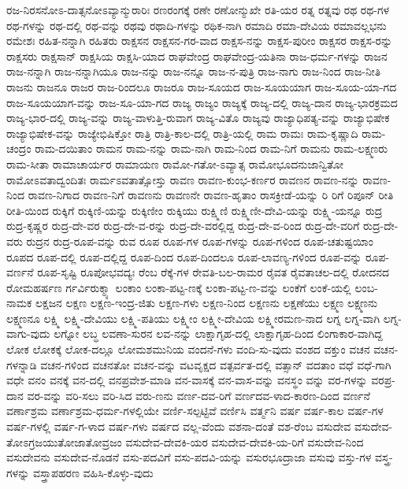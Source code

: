ರಜ-ನಿರಸನೋಽ-ದಾತ್ಸನೋಽವ್ಯಾನ್ಮುರಾರಿಃ
ರಣರಂಗಕ್ಕೆ
ರಣೇ
ರಣೋನ್ಮುಖೇ
ರತಿ-ಯರ
ರತ್ನ
ರತ್ನವು
ರಥ
ರಥ-ಗಳ
ರಥ-ಗಳನ್ನು
ರಥ-ದಲ್ಲಿ
ರಥ-ವನ್ನು
ರಥವು
ರಥಾದಿ-ಗಳನ್ನು
ರಥಿಕ-ನಾಗಿ
ರಮಾದಿ
ರಮಾ-ದೇವಿಯ
ರಮಾವಲ್ಲಭನು
ರಮೇಶಃ
ರಹಿತ-ನನ್ನಾಗಿ
ರಹಿತರು
ರಾಕ್ಷಸನ
ರಾಕ್ಷಸನ-ಗರ-ವಾದ
ರಾಕ್ಷಸ-ನನ್ನು
ರಾಕ್ಷಸ-ಪುರೀಂ
ರಾಕ್ಷಸರ
ರಾಕ್ಷಸ-ರನ್ನು
ರಾಕ್ಷಸರು
ರಾಕ್ಷಸಾನ್
ರಾಕ್ಷಸಿಯ
ರಾಕ್ಷಸಿ-ಯಾದ
ರಾಘವೇಂದ್ರ
ರಾಘವೇಂದ್ರ-ಯತಿನಾ
ರಾಜ-ಧರ್ಮ-ಗಳನ್ನು
ರಾಜನ
ರಾಜ-ನನ್ನಾಗಿ
ರಾಜ-ನನ್ನಾಗಿಯೂ
ರಾಜ-ನನ್ನು
ರಾಜ-ನನ್ನೂ
ರಾಜ-ನ-ಪುತ್ರಿ
ರಾಜ-ನಾಗು
ರಾಜ-ನಿಂದ
ರಾಜ-ನೀತಿ
ರಾಜನು
ರಾಜನೂ
ರಾಜರ
ರಾಜ-ರಿಂದಲೂ
ರಾಜರೂ
ರಾಜ-ಸೂಯದ
ರಾಜ-ಸೂಯಯಾಗ
ರಾಜ-ಸೂಯ-ಯಾ-ಗದ
ರಾಜ-ಸೂಯಯಾಗ-ವನ್ನು
ರಾಜ-ಸೂ-ಯಾ-ಗದ
ರಾಜ್ಯ
ರಾಜ್ಯಂ
ರಾಜ್ಯಕ್ಕೆ
ರಾಜ್ಯ-ದಲ್ಲಿ
ರಾಜ್ಯ-ದಾನ
ರಾಜ್ಯ-ಭಾರಕ್ರಮದ
ರಾಜ್ಯ-ಭಾರ-ದಲ್ಲಿ
ರಾಜ್ಯ-ವನ್ನು
ರಾಜ್ಯ-ವಾಳುತ್ತಿ-ರುವಾಗ
ರಾಜ್ಯ-ವಿತೊ
ರಾಜ್ಯವು
ರಾಜ್ಯಾಧಿಪತ್ಯ-ವನ್ನು
ರಾಜ್ಯಾಭಿಷೇಕ
ರಾಜ್ಯಾಭಿಷೇಕ-ವನ್ನು
ರಾಜ್ಯೇಭಿಷಿಕ್ತೋ
ರಾತ್ರಿ
ರಾತ್ರಿ-ಕಾಲ-ದಲ್ಲಿ
ರಾತ್ರಿ-ಯಲ್ಲಿ
ರಾಮ
ರಾಮಃ
ರಾಮ-ಕೃಷ್ಣಾದಿ
ರಾಮ-ಚಂದ್ರಂ
ರಾಮ-ದಯಿತಾಂ
ರಾಮನ
ರಾಮ-ನನ್ನು
ರಾಮ-ನಾಗಿ
ರಾಮ-ನಿಂದ
ರಾಮ-ನಿಗೆ
ರಾಮನು
ರಾಮ-ಲಕ್ಷ್ಮಣರು
ರಾಮ-ಸೀತಾ
ರಾಮಾಚಾರ್ಯರ
ರಾಮಾಯಣ
ರಾಮೋ-ಗತೋ-ಽವ್ಯಾತ್ಸ
ರಾಮೋಭೂದನುಜಾನ್ವಿತೋ
ರಾಮೋಽವತಾದ್ವಂದಿತಃ
ರಾರ್ಮಽವತಾತ್ಸೋಸ್ತು
ರಾವಣ
ರಾವಣ-ಕುಂಭ-ಕರ್ಣರ
ರಾವಣನ
ರಾವಣ-ನನ್ನು
ರಾವಣ-ನಿಂದ
ರಾವಣ-ನಿಗಾದ
ರಾವಣ-ನಿಗೆ
ರಾವಣನು
ರಾವಣನೇ
ರಾವಣ-ಹೃತಾಂ
ರಾಸಕ್ರೀಡೆ-ಯನ್ನು
ರಿ
ರಿಗೆ
ರಿಪೂನ್
ರೀತಿ
ರೀತಿ-ಯಿಂದ
ರುಕ್ಕಿಗೆ
ರುಕ್ಕಿಣಿ-ಯನ್ನು
ರುಕ್ಕಿಣೀಂ
ರುಕ್ಕಿಯು
ರುಕ್ಷ್ಮಿಣಿ
ರುಕ್ಷ್ಮಿಣೀ-ದೇವಿ-ಯನ್ನು
ರುಕ್ಷ್ಮಿ-ಯನ್ನೂ
ರುದ್ರ
ರುದ್ರ-ಕೃಷ್ಣರ
ರುದ್ರ-ದೇ-ವರ
ರುದ್ರ-ದೇ-ವ-ರನ್ನು
ರುದ್ರ-ದೇ-ವರಲ್ಲಿದ್ದ
ರುದ್ರ-ದೇ-ವ-ರಿಂದ
ರುದ್ರ-ದೇ-ವರಿಗೆ
ರುದ್ರ-ದೇ-ವರು
ರುದ್ರನ
ರುದ್ರ-ರೂಪ-ವನ್ನು
ರುವ
ರೂಪ
ರೂಪ-ಗಳ
ರೂಪ-ಗಳನ್ನು
ರೂಪ-ಗಳಿಂದ
ರೂಪ-ಚತುಷ್ಟಯಿಾಂ
ರೂಪದ
ರೂಪ-ದಲ್ಲಿ
ರೂಪ-ದಲ್ಲಿದ್ದ
ರೂಪ-ದಿಂದ
ರೂಪ-ದಿಂದಲೂ
ರೂಪ-ಲಾವಣ್ಯ-ಗಳಿಂದ
ರೂಪ-ವನ್ನು
ರೂಪ-ವರ್ಣನೆ
ರೂಪ-ಸೃಷ್ಟಿ
ರೂಪೋಭವದ್ಯಃ
ರೆಂಬ
ರೆಕ್ಕೆ-ಗಳ
ರೇವತಿ-ಬಲ-ರಾಮರ
ರೈವತ
ರೈವತಾಚಲ-ದಲ್ಲಿ
ರೋದನದ
ರೋಮಹರ್ಷಣ
ರ್ಗರ್ವಿರುಕ್ಮ್ಯಾ
ಲಂಕಾಂ
ಲಂಕಾ-ಪಟ್ಟ-ಣಕ್ಕೆ
ಲಂಕಾ-ಪಟ್ಟ-ಣ-ವನ್ನು
ಲಂಕೆಗೆ
ಲಂಕೆ-ಯಲ್ಲಿ
ಲಂಬ-ನಾಮಕ
ಲಕ್ಷಜನ
ಲಕ್ಷಣ
ಲಕ್ಷಣ-ಇಂದ್ರ-ಜಿತು
ಲಕ್ಷಣ-ಗಳು
ಲಕ್ಷಣ-ನಿಂದ
ಲಕ್ಷಣನು
ಲಕ್ಷಣೆಯು
ಲಕ್ಷ್ಮಣ
ಲಕ್ಷ್ಮಣನು
ಲಕ್ಷ್ಮಣನೂ
ಲಕ್ಷ್ಮಿ
ಲಕ್ಷ್ಮಿ-ದೇವಿಯು
ಲಕ್ಷ್ಮಿ-ಪತಿಯು
ಲಕ್ಷ್ಮೀಂ
ಲಕ್ಷ್ಮೀ-ದೇವಿಯ
ಲಕ್ಷ್ಮೀರಮಣ-ನಾದ
ಲಗ್ನ
ಲಗ್ನ-ವಾಗಿ
ಲಗ್ನ-ವಾಗು-ವುದು
ಲಗ್ನೋ
ಲಬ್ಧ
ಲವಣಾ-ಸುರನ
ಲವ-ನನ್ನು
ಲಾಕ್ಷಾಗೃಹ-ದಲ್ಲಿ
ಲಾಕ್ಷಾಗೃಹ-ದಿಂದ
ಲಿಂಗಾಕಾರ-ವಾಗಿದ್ದ
ಲೋಕ
ಲೋಕಕ್ಕೆ
ಲೋಕ-ದಲ್ಲೂ
ಲೋಮಶಮುನಿಯ
ವಂದನೆ-ಗಳು
ವಂದಿ-ಸು-ವುದು
ವಂಶದ
ವಕ್ತುಂ
ವಚನ
ವಚನ-ಗಳನ್ನಾಡಿ
ವಚನ-ಗಳಿಂದ
ವಚನತೋ
ವಚನ-ವನ್ನು
ವಟವೃಕ್ಷದ
ವತ್ಪರ್ವತ-ದಲ್ಲಿ
ವತ್ಸಾನ್
ವದತಾಂ
ವಧೆ
ವಧೆ-ಗಾಗಿ
ವಧೇ
ವನಂ
ವನಕ್ಕೆ
ವನ-ದಲ್ಲಿ
ವನಪ್ರವೇಶ-ಮಾಡಿ
ವನ-ವಾಸಕ್ಕೆ
ವನ-ವಾಸ-ವನ್ನು
ವನಸ್ಥಂ
ವನ್ನು
ವರ-ಗಳನ್ನು
ವರಪ್ರ-ದಾನ
ವರ-ವನ್ನು
ವರಿ-ಸಲು
ವರಿ-ಸಿದ
ವರು-ಣನು
ವರ್ಣ-ದವ-ರಿಗೆ
ವರ್ಣದವ-ಳಾದ-ಕಾರಣ-ದಿಂದ
ವರ್ಣನೆ
ವರ್ಣಾಶ್ರಮ
ವರ್ಣಾಶ್ರಮ-ಧರ್ಮ-ಗಳಲ್ಲಿಯೇ
ವರ್ಣಿ-ಸಲ್ಪಟ್ಟಿವೆ
ವರ್ಣಿಸಿ
ವರ್ತ್ಮನಿ
ವರ್ಷ
ವರ್ಷ-ಕಾಲ
ವರ್ಷ-ಗಳ
ವರ್ಷ-ಗಳಲ್ಲಿ
ವರ್ಷ-ಗ-ಳಾದ
ವರ್ಷ-ಗಳು
ವರ್ಷದ
ವಲ್ಲ-ವೆಂದು
ವಶನಾ-ದಂತೆ
ವಶ-ರೆಂಬ
ವಸುದೇವ
ವಸುದೇವ-ತೋಽಗ್ರಜಯುತೋಜಾತೋವ್ರಜಂ
ವಸುದೇವ-ದೇವಕಿ-ಯರ
ವಸುದೇವ-ದೇವಕಿ-ಯ-ರಿಗೆ
ವಸುದೇವ-ನಿಂದ
ವಸುದೇವನು
ವಸುದೇವ-ನೊಡನೆ
ವಸು-ಪದವಿಗೆ
ವಸು-ಪದವಿ-ಯನ್ನು
ವಸುರಭೂದ್ರಾಜಾ
ವಸುವು
ವಸ್ತು-ಗಳ
ವಸ್ತ್ರ-ಗಳನ್ನು
ವಸ್ತ್ರಾಪಹರಣ
ವಹಿಸಿ-ಕೊಳ್ಳು-ವುದು
